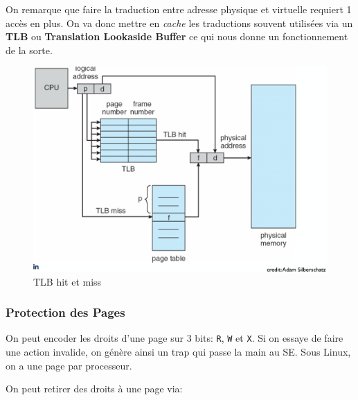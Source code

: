 On remarque que faire la traduction entre adresse physique et virtuelle
requiert 1 accès en plus. On va donc mettre en \emph{cache} les
traductions souvent utilisées via un \textbf{TLB} ou \textbf{Translation
Lookaside Buffer} ce qui nous donne un fonctionnement de la sorte.

\begin{figure}
\centering
\includegraphics{image-56.png}
\caption{TLB hit et miss}
\end{figure}

\subsubsection{Protection des Pages}\label{protection-des-pages}

On peut encoder les droits d'une page sur 3 bits: \texttt{R}, \texttt{W}
et \texttt{X}. Si on essaye de faire une action invalide, on génère
ainsi un trap qui passe la main au SE. Sous Linux, on a une page par
processeur.

On peut retirer des droits à une page via:

\begin{Shaded}
\begin{Highlighting}[]
\PreprocessorTok{ }

\OperatorTok{(}  \OperatorTok{*}\OperatorTok{,} \OperatorTok{,} \OperatorTok{);}
\end{Highlighting}
\end{Shaded}

